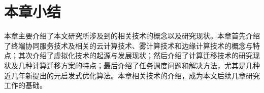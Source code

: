 \section{本章小结}\label{sec:related_work_summary}

本章主要介绍了本文研究所涉及到的相关技术的概念以及研究现状。本章首先介绍了终端协同服务技术及相关的云计算技术、雾计算技术和边缘计算技术的概念与特点；其次介绍了虚拟化技术的起源与发展现状；然后介绍了计算迁移技术的研究现状及几种计算迁移方案的特点；最后介绍了任务调度问题和解决方法，尤其是几种近几年新提出的元启发式优化算法。本章相关技术的介绍，成为本文后续几章研究工作的基础。